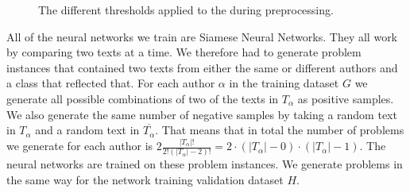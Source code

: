 \begin{figure}[htb]

    \caption{The different thresholds applied to the during preprocessing.}
    \label{fig:character_frequencies}
\end{figure}

All of the neural networks we train are Siamese Neural Networks. They all
work by comparing two texts at a time. We therefore had to generate problem
instances that contained two texts from either the same or different authors and
a class that reflected that. For each author $\alpha$ in the training dataset
$G$ we generate all possible combinations of two of the texts in $T_\alpha$
as positive samples. We also generate the same number of negative samples by
taking a random text in $T_\alpha$ and a random text in $\overline{T_\alpha}$.
That means that in total the number of problems we generate for each author
is $ 2\frac{\left|T_\alpha\right|!}{2!(\left|T_\alpha\right|-2)!} = 2 \cdot
(\left|T_\alpha\right| - 0) \cdot (\left|T_\alpha\right| - 1) $. The neural
networks are trained on these problem instances. We generate problems in the
same way for the network training validation dataset $H$.
